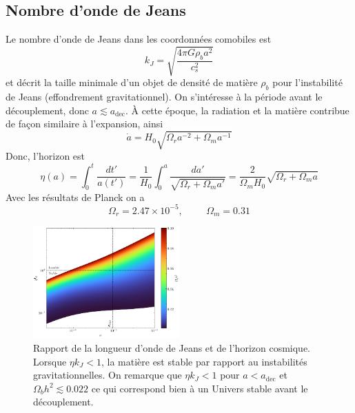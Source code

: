 \documentclass{article}
\numberwithin{equation}{section}
\begin{document}
\subsection{Nombre d'onde de Jeans}
Le nombre d'onde de Jeans dans les coordonnées comobiles est 
\[
        k_J = \sqrt{\frac{4\pi G \rho_b a^2}{c_s^2}}
\]
et décrit la taille minimale d'un objet de densité de matière $\rho_b$ 
pour l'instabilité de Jeans (effondrement gravitationnel). 
On s'intéresse à la période avant le découplement, donc 
$a \lesssim a_{\text{dec}}$. À cette époque, la radiation 
et la matière contribue de façon similaire à l'expansion, ainsi 
\[
        \dot{a} = H_0 \sqrt{\Omega_r a^{-2} + \Omega_m a^{-1} } 
\]
Donc, l'horizon est
\[
        \eta(a) = \int_{0}^{t} \frac{dt'}{a(t')} 
        = \frac{1}{H_0}\int_0^{a}\frac{da'}{\sqrt{\Omega_r + \Omega_m a'}}
        = \frac{2}{\Omega_m H_0} \sqrt{\Omega_r + \Omega_m a}
\]
Avec les résultats de Planck on a
\[
        \Omega_r = 2.47\times 10^{-5}, \hspace{1cm} \Omega_m = 0.31
\]

\begin{figure}[H]
        \centering
        \includegraphics[width=0.5\textwidth]{eta_kj}
        \caption{Rapport de la longueur d'onde de Jeans et de l'horizon cosmique. 
        Lorsque $\eta k_J < 1$, la matière est stable par rapport au instabilités gravitationnelles. On 
remarque que $\eta k_J < 1$ pour $a < a_{\text{dec}}$ et $\Omega_b h^2 \lesssim 0.022$ 
ce qui correspond bien à un Univers stable avant 
le découplement.}
\end{figure}
\end{document}
